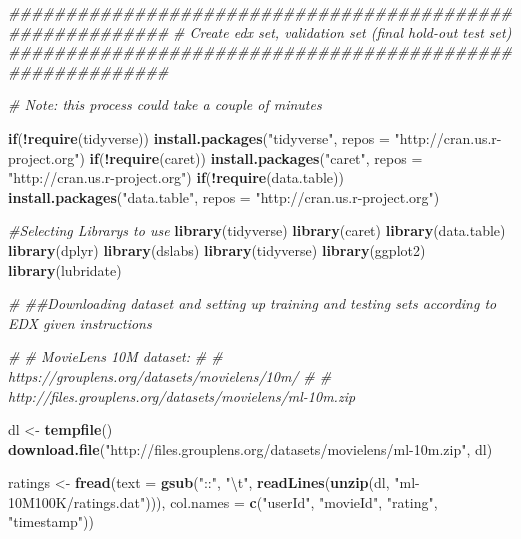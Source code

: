\documentclass[
]{article}
\newenvironment{Shaded}{\begin{snugshade}}{\end{snugshade}}
\newcommand{\CharTok}[1]{\textcolor[rgb]{0.31,0.60,0.02}{#1}}
\newcommand{\CommentTok}[1]{\textcolor[rgb]{0.56,0.35,0.01}{\textit{#1}}}
\newcommand{\ControlFlowTok}[1]{\textcolor[rgb]{0.13,0.29,0.53}{\textbf{#1}}}
\newcommand{\DataTypeTok}[1]{\textcolor[rgb]{0.13,0.29,0.53}{#1}}
\newcommand{\KeywordTok}[1]{\textcolor[rgb]{0.13,0.29,0.53}{\textbf{#1}}}
\newcommand{\NormalTok}[1]{#1}
\newcommand{\OperatorTok}[1]{\textcolor[rgb]{0.81,0.36,0.00}{\textbf{#1}}}
\newcommand{\StringTok}[1]{\textcolor[rgb]{0.31,0.60,0.02}{#1}}
\begin{document}
\begin{Shaded}
\begin{Highlighting}[]
\CommentTok{##########################################################}
\CommentTok{# Create edx set, validation set (final hold-out test set)}
\CommentTok{##########################################################}

\CommentTok{# Note: this process could take a couple of minutes}

\ControlFlowTok{if}\NormalTok{(}\OperatorTok{!}\KeywordTok{require}\NormalTok{(tidyverse)) }\KeywordTok{install.packages}\NormalTok{(}\StringTok{"tidyverse"}\NormalTok{, }\DataTypeTok{repos =} \StringTok{"http://cran.us.r-project.org"}\NormalTok{)}
\ControlFlowTok{if}\NormalTok{(}\OperatorTok{!}\KeywordTok{require}\NormalTok{(caret)) }\KeywordTok{install.packages}\NormalTok{(}\StringTok{"caret"}\NormalTok{, }\DataTypeTok{repos =} \StringTok{"http://cran.us.r-project.org"}\NormalTok{)}
\ControlFlowTok{if}\NormalTok{(}\OperatorTok{!}\KeywordTok{require}\NormalTok{(data.table)) }\KeywordTok{install.packages}\NormalTok{(}\StringTok{"data.table"}\NormalTok{, }\DataTypeTok{repos =} \StringTok{"http://cran.us.r-project.org"}\NormalTok{)}

\CommentTok{#Selecting Librarys to use}
\KeywordTok{library}\NormalTok{(tidyverse)}
\KeywordTok{library}\NormalTok{(caret)}
\KeywordTok{library}\NormalTok{(data.table)}
\KeywordTok{library}\NormalTok{(dplyr)}
\KeywordTok{library}\NormalTok{(dslabs)}
\KeywordTok{library}\NormalTok{(tidyverse)}
\KeywordTok{library}\NormalTok{(ggplot2)}
\KeywordTok{library}\NormalTok{(lubridate)}

\CommentTok{# ##Downloading dataset and setting up training and testing sets according to EDX given instructions}
 
\CommentTok{# # MovieLens 10M dataset:}
\CommentTok{# # https://grouplens.org/datasets/movielens/10m/}
\CommentTok{# # http://files.grouplens.org/datasets/movielens/ml-10m.zip}
 
\NormalTok{dl <-}\StringTok{ }\KeywordTok{tempfile}\NormalTok{()}
\KeywordTok{download.file}\NormalTok{(}\StringTok{"http://files.grouplens.org/datasets/movielens/ml-10m.zip"}\NormalTok{, dl)}

\NormalTok{ratings <-}\StringTok{ }\KeywordTok{fread}\NormalTok{(}\DataTypeTok{text =} \KeywordTok{gsub}\NormalTok{(}\StringTok{"::"}\NormalTok{, }\StringTok{"}\CharTok{\textbackslash{}t}\StringTok{"}\NormalTok{, }\KeywordTok{readLines}\NormalTok{(}\KeywordTok{unzip}\NormalTok{(dl, }\StringTok{"ml-10M100K/ratings.dat"}\NormalTok{))),}
                 \DataTypeTok{col.names =} \KeywordTok{c}\NormalTok{(}\StringTok{"userId"}\NormalTok{, }\StringTok{"movieId"}\NormalTok{, }\StringTok{"rating"}\NormalTok{, }\StringTok{"timestamp"}\NormalTok{))}


\end{Highlighting}
\end{Shaded}
\end{document}
